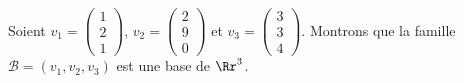 \documentclass[class=report,crop=false]{standalone}
\begin{document}
\begin{exemple}
\label{ex:baser3}
  Soient
  $v_1 = \left(\begin{smallmatrix}1\\2\\1\end{smallmatrix}\right)$,
  $v_2 = \left(\begin{smallmatrix}2\\9\\0\end{smallmatrix}\right)$ et
  $v_3 = \left(\begin{smallmatrix}3\\3\\4\end{smallmatrix}\right)$.
  Montrons que la famille $\mathcal{B} = (v_1, v_2, v_3)$ est une base de $\Rr^3$.


\end{exemple}
\end{document}
